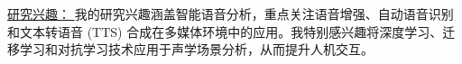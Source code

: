  \small{ \underline{研究兴趣： }  我的研究兴趣涵盖智能语音分析，重点关注语音增强、自动语音识别和文本转语音 (TTS) 合成在多媒体环境中的应用。我特别感兴趣将深度学习、迁移学习和对抗学习技术应用于声学场景分析，从而提升人机交互。}